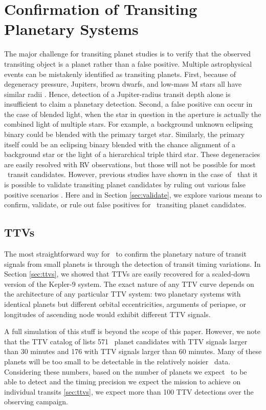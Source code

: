 \section{Confirmation of Transiting Planetary Systems}
\label{sec:confirm}


The major challenge for transiting planet studies is to verify that the observed transiting object is a planet rather than a false positive. 
Multiple astrophysical events can be mistakenly identified as transiting planets. 
First, because of degeneracy pressure, Jupiters, brown dwarfs, and low-mass M stars all have similar radii \citep{Chabrier97}.
Hence, detection of a Jupiter-radius transit depth alone is insufficient to claim a planetary detection. 
Second, a false positive can occur in the case of blended light, when the star in 
question in the aperture is actually the combined light of multiple stars.
For example, a background unknown eclipsing binary could be blended with the primary target
star.
Similarly, the primary itself could be an eclipsing binary blended with the chance alignment
of a background star or the light of a hierarchical triple third star.
These degeneracies are easily resolved with RV observations, but those will not be possible for most \WF\ transit candidates.
However, previous studies have shown in the case of \kep\ that it is possible to validate transiting planet candidates by ruling out various false positive scenarios \citep{Morton12, Morton16}. Here and in Section \ref{sec:validate}, we explore various means to confirm, validate, or rule out false positives for \WF\ transiting planet candidates.




\subsection{TTVs}

The most straightforward way for \WF\ to confirm the planetary nature of transit signals from small
planets is through the detection of transit timing variations.
In Section \ref{sec:ttvs}, we showed that TTVs are easily recovered for a scaled-down version of the Kepler-9 system.
The exact nature of any TTV curve depends on the architecture of any particular TTV 
system: two planetary systems with identical planets but different orbital eccentricities,
arguments of periapse, or longitudes of ascending node would exhibit different TTV
signals. 

A full simulation of this stuff is beyond the scope of this paper. However, we note that
the TTV catalog of \citet{Holczer16} lists 571 \kep\ planet candidates with
TTV signals larger than 30 minutes and 176 with TTV signals larger than 60 minutes.
Many of these planets will be too small to be detectable in the relatively noisier
\WF\ data.
Considering these numbers,
based on the number of planets we expect \WF\ to be able to detect and the timing precision 
we expect the mission to achieve on individual transits \ref{sec:ttvs}, 
we expect more than 100 TTV detections over the observing campaign. 

